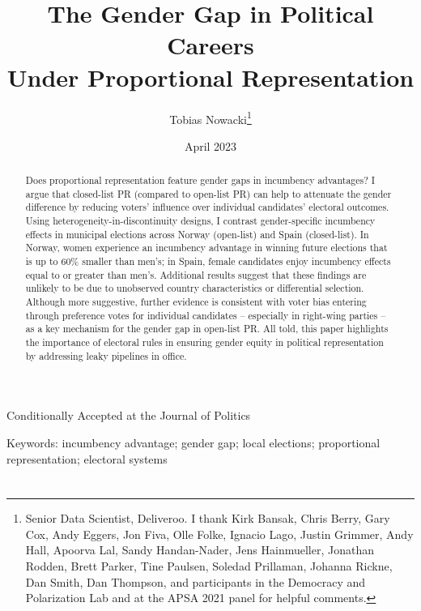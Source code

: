 \documentclass[12pt]{article}
\title{The Gender Gap in Political Careers \\ Under Proportional Representation}
\date{April 2023}
\date{}
\author{Tobias Nowacki\thanks{Senior Data Scientist, Deliveroo. I thank Kirk Bansak, Chris Berry, Gary Cox, Andy Eggers, Jon Fiva, Olle Folke, Ignacio Lago, Justin Grimmer, Andy Hall, Apoorva Lal, Sandy Handan-Nader, Jens Hainmueller, Jonathan Rodden, Brett Parker, Tine Paulsen, Soledad Prillaman, Johanna Rickne, Dan Smith, Dan Thompson, and participants in the Democracy and Polarization Lab and at the APSA 2021 panel for helpful comments.}}
\renewcommand \thepart{}
\renewcommand \partname{}
\begin{document}
%
%

\renewcommand \thepart{}
\renewcommand \partname{}

\maketitle
\thispagestyle{empty}

\begin{center}
    {Conditionally Accepted at the Journal of Politics}
\end{center}

\singlespacing
\begin{abstract}
    Does proportional representation feature gender gaps in incumbency advantages?  I argue that closed-list PR (compared to open-list PR) can help to attenuate the gender difference by reducing voters' influence over individual candidates' electoral outcomes. Using heterogeneity-in-discontinuity designs, I contrast gender-specific incumbency effects in municipal elections across Norway (open-list) and Spain (closed-list). In Norway, women experience an incumbency advantage in winning future elections that is up to 60\% smaller than men's; in Spain, female candidates enjoy incumbency effects equal to or greater than men's. Additional results suggest that these findings are unlikely to be due to unobserved country characteristics or differential selection. Although more suggestive, further evidence is consistent with voter bias entering through preference votes for individual candidates -- especially in right-wing parties -- as a key mechanism for the gender gap in open-list PR. All told, this paper highlights the importance of electoral rules in ensuring gender equity in political representation by addressing leaky pipelines in office.
\end{abstract}

Keywords: incumbency advantage; gender gap; local elections; proportional representation; electoral systems

\doparttoc %
\faketableofcontents %

\part{} %


\clearpage
{}
\doublespacing
\end{document}
